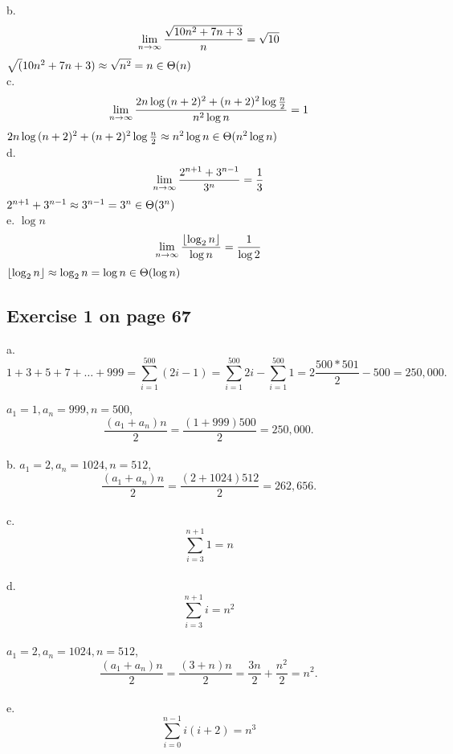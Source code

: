 \documentclass[12pt]{amsart}
\begin{document}
b. 
\[
\lim_{n \rightarrow \infty} \frac{\sqrt{10n^2 + 7n + 3}}{n} = \sqrt{10}\\
\]
$\sqrt(10n^2 + 7n + 3) \approx \sqrt{n^2} = n \in \Theta(n)\\$\\

c. 
\[
\lim_{n \rightarrow \infty} \frac{2n \log{(n+2)^2}+(n+2)^2 \log{\frac{n}{2}}}{n^2\log{n}} = 1\\
\]
$2n \log{(n+2)^2}+(n+2)^2 \log{\frac{n}{2}} \approx n^2 \log{n}  \in \Theta(n^2 \log{n})\\$\\

d.
\[
\lim_{n \rightarrow \infty} \frac{2^{n+1} + 3^{n-1}}{3^n} = \frac{1}{3}\\
\]
$2^{n+1} + 3^{n-1} \approx 3^{n-1}  = 3^n \in \Theta(3^n)\\$\\

e. $\log{n}$
\[
\lim_{n \rightarrow \infty} \frac{\lfloor{\log_2{n}}\rfloor}{\log{n}} = \frac{1}{\log{2}}\\
\]
$\lfloor{\log_2{n}}\rfloor \approx \log_2{n}  = \log{n} \in \Theta(\log{n})\\$\\


\subsection{Exercise 1 on page 67} $ $\\ 

a. 
  \[1 + 3 + 5 + 7 + \ldots + 999 = \sum_{i = 1}^{500} (2i - 1) = \sum_{i = 1}^{500} 2i - \sum_{i = 1}^{500} 1
= 2 \frac{500 * 501}{2} - 500 = 250,000.\]

  $a_1 = 1, a_n = 999, n = 500$, 
  \[\frac{(a_1 + a_n)n}{2} = \frac{(1+999)500}{2} = 250,000.\]\\


b.
  $a_1 = 2, a_n = 1024, n = 512$, 
  \[\frac{(a_1 + a_n)n}{2} = \frac{(2+1024)512}{2} = 262,656.\]\\

c.
 \[ \sum_{i=3}^{n+1} 1 = n \] \\

d.
 \[ \sum_{i=3}^{n+1} i = n^2 \]\\
  $a_1 = 2, a_n = 1024, n = 512$, 
  \[\frac{(a_1 + a_n)n}{2} = \frac{(3+n)n}{2} = \frac{3n}{2} + \frac{n^2}{2} = n^2 .\]\\

e.
 \[ \sum_{i=0}^{n-1} i(i+2) = n^3 \]\\
\end{document}
